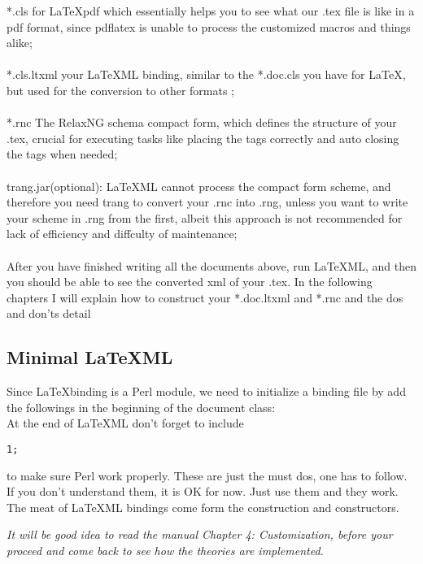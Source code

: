 \documentclass{book}
\begin{document}
 *.cls for \LaTeX pdf which essentially helps you to see what our .tex file is like in a pdf format, since pdflatex is unable to process the customized macros and things alike; \\ \\

*.cls.ltxml your \LaTeX ML binding, similar to the *.doc.cls you have for \LaTeX, but used for the conversion to other formats ; \\ \\

*.rnc The RelaxNG schema compact form, which defines the structure of your .tex, crucial for executing tasks like placing the tags correctly and auto closing the tags when needed; \\ \\

trang.jar(optional): \LaTeX ML  cannot process the compact form scheme, and therefore you need trang to convert your .rnc into .rng, unless you 
want to write your scheme in .rng from the first, albeit this approach is not recommended for lack of efficiency and diffculty of maintenance; \\ \\

After you have finished writing all the documents above, run \LaTeX ML, and then you should be able to see the converted xml of your .tex. In the following 
chapters I will explain how to construct your *.doc.ltxml and *.rnc and the dos and don'ts detail 

\subsection{Minimal \LaTeX ML}
Since \LaTeX binding is a Perl module, we need to initialize a binding file by add the followings in the beginning of the document class: \\
 
At the end of \LaTeX ML don't forget to include \\
\begin{lstlisting}
1;
\end{lstlisting}
to make sure Perl work properly.
These are just the must dos, one has to follow. If you don't understand them, it is OK for now. Just use them and they work.
The meat of \LaTeX ML bindings come form the construction and constructors.\\ 

\begin{tcolorbox}
{\emph{It will be good idea to read the manual Chapter 4: Customization, before
your proceed and come back to see how the theories are implemented.}}
\end{tcolorbox}
\end{document}
